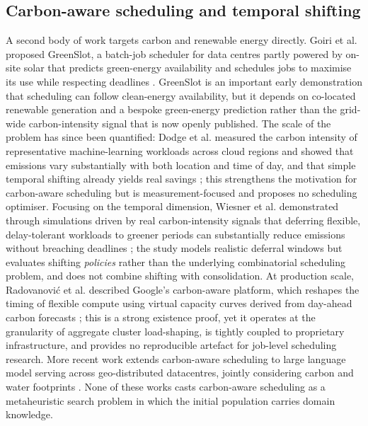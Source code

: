 \documentclass[12pt,a4paper]{article}
\begin{document}
\subsection{Carbon-aware scheduling and temporal shifting}
A second body of work targets carbon and renewable energy directly. Goiri et al. proposed GreenSlot, a
batch-job scheduler for data centres partly powered by on-site solar that predicts green-energy availability
and schedules jobs to maximise its use while respecting deadlines \cite{goiri2011greenslot}. GreenSlot is an
important early demonstration that scheduling can follow clean-energy availability, but it depends on
co-located renewable generation and a bespoke green-energy prediction rather than the grid-wide
carbon-intensity signal that is now openly published. The scale of the problem has since been quantified:
Dodge et al. measured the carbon intensity of representative machine-learning workloads across cloud regions
and showed that emissions vary substantially with both location and time of day, and that simple temporal
shifting already yields real savings \cite{dodge2022measuring}; this strengthens the motivation for
carbon-aware scheduling but is measurement-focused and proposes no scheduling optimiser. Focusing on the
temporal dimension, Wiesner et al. demonstrated through simulations driven by real carbon-intensity signals
that deferring flexible, delay-tolerant workloads to greener periods can substantially reduce emissions
without breaching deadlines \cite{wiesner2021lets}; the study models realistic deferral windows but evaluates
shifting \emph{policies} rather than the underlying combinatorial scheduling problem, and does not combine
shifting with consolidation. At production scale, Radovanovi\'c et al. described Google's carbon-aware
platform, which reshapes the timing of flexible compute using virtual capacity curves derived from day-ahead
carbon forecasts \cite{radovanovic2023carbon}; this is a strong existence proof, yet it operates at the
granularity of aggregate cluster load-shaping, is tightly coupled to proprietary infrastructure, and provides
no reproducible artefact for job-level scheduling research. More recent work extends carbon-aware scheduling to
large language model serving across geo-distributed datacentres, jointly considering carbon and water
footprints \cite{moore2025sustainable}. None of these works casts carbon-aware scheduling as a metaheuristic
search problem in which the initial population carries domain knowledge.
\end{document}
